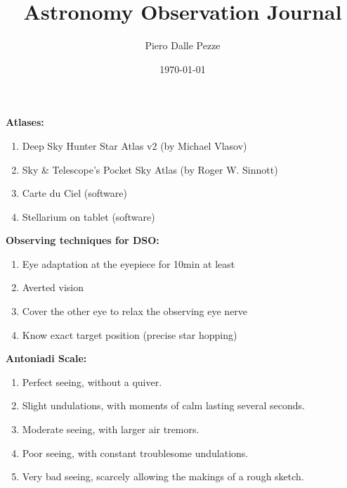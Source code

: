 \documentclass[10pt,twoside,a4paper]{article}
\title{Astronomy Observation Journal}
\author{Piero Dalle Pezze}
\date{\today}
\begin{document}
\maketitle
\let\thefootnote\relax{}

\newpage

\footnotesize

\noindent 

{\bf Atlases:}
\begin{enumerate}  
\item Deep Sky Hunter Star Atlas v2 (by Michael Vlasov)
\item Sky \& Telescope's Pocket Sky Atlas (by Roger W. Sinnott)
\item Carte du Ciel (software)
\item Stellarium on tablet (software)
\end{enumerate}

\bigskip 
{\bf Observing techniques for DSO:}
\begin{enumerate}
\item Eye adaptation at the eyepiece for 10min at least 
\item Averted vision 
\item Cover the other eye to relax the observing eye nerve 
\item Know exact target position (precise star hopping) 
\end{enumerate} 

\bigskip 
{\bf Antoniadi Scale:}
\begin{enumerate}
\item Perfect seeing, without a quiver.
\item Slight undulations, with moments of calm lasting several seconds.
\item Moderate seeing, with larger air tremors.
\item Poor seeing, with constant troublesome undulations.
\item Very bad seeing, scarcely allowing the makings of a rough sketch.
\end{enumerate}
\end{document}
